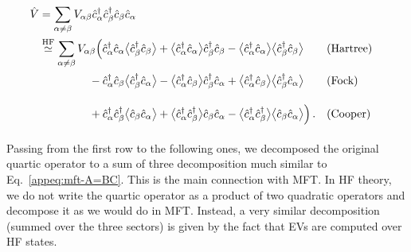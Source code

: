 \begin{align}
	\hat V &= \sum_{\alpha\neq\beta} V_{\alpha\beta} \hat c_\alpha^\dagger \hat c_\beta^\dagger \hat c_\beta \hat c_\alpha \label{appeq:mft-V-decomposition} \\
	&\HFsimeq \sum_{\alpha\neq\beta} V_{\alpha\beta} \Big(
	\hat c_\alpha^\dagger \hat c_\alpha \big\langle \hat c_\beta^\dagger \hat c_\beta \big\rangle + \big\langle \hat c_\alpha^\dagger \hat c_\alpha \big\rangle \hat c_\beta^\dagger \hat c_\beta - \big\langle \hat c_\alpha^\dagger \hat c_\alpha \big\rangle  \big\langle \hat c_\beta^\dagger \hat c_\beta \big\rangle &&(\text{Hartree}) \nonumber\\
	&\phantom{\simeq \sum_{\alpha\neq\beta} V_{\alpha\beta}}
	- \hat c_\alpha^\dagger \hat c_\beta \big\langle \hat c_\beta^\dagger \hat c_\alpha \big\rangle - \big\langle \hat c_\alpha^\dagger \hat c_\beta \big\rangle \hat c_\beta^\dagger \hat c_\alpha + \big\langle \hat c_\alpha^\dagger \hat c_\beta \big\rangle  \big\langle \hat c_\beta^\dagger \hat c_\alpha \big\rangle &&(\text{Fock}) \nonumber\\
	&\phantom{\simeq \sum_{\alpha\neq\beta} V_{\alpha\beta}}
	+ \hat c_\alpha^\dagger \hat c_\beta^\dagger \big\langle \hat c_\beta \hat c_\alpha \big\rangle + \big\langle \hat c_\alpha^\dagger \hat c_\beta^\dagger \big\rangle \hat c_\beta \hat c_\alpha - \big\langle \hat c_\alpha^\dagger \hat c_\beta^\dagger \big\rangle  \big\langle \hat c_\beta \hat c_\alpha \big\rangle
	\Big) \, . &&(\text{Cooper}) \nonumber
\end{align}
Passing from the first row to the following ones, we decomposed the original quartic operator to a sum of three decomposition much similar to Eq.~\eqref{appeq:mft-A=BC}. This is the main connection with MFT. In HF theory, we do not write the quartic operator as a product of two quadratic operators and decompose it as we would do in MFT. Instead, a very similar decomposition (summed over the three sectors) is given by the fact that EVs are computed over HF states.